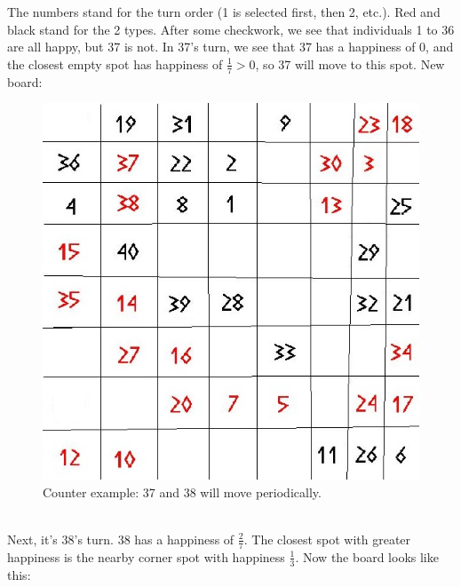 \documentclass{article}
\begin{document}
The numbers stand for the turn order (1 is selected first, then 2, etc.). Red and black stand for the 2 types. After some checkwork, we see that individuals 1 to 36 are all happy, but 37 is not. In 37's turn, we see that 37 has a happiness of $0$, and the closest empty spot has happiness of $\frac{1}{7} > 0$, so 37 will move to this spot. New board:
\begin{figure}[!ht]
\begin{center}
\includegraphics[scale=0.25]{segregation_tegenvb_1.jpg}
\end{center}
\caption{Counter example: 37 and 38 will move periodically.}\label{counterexample1}
\end{figure}
\\Next, it's 38's turn. 38 has a happiness of $\frac{2}{7}$. The closest spot with greater happiness is the nearby corner spot with happiness $\frac{1}{3}$. Now the board looks like this:\\
\end{document}
